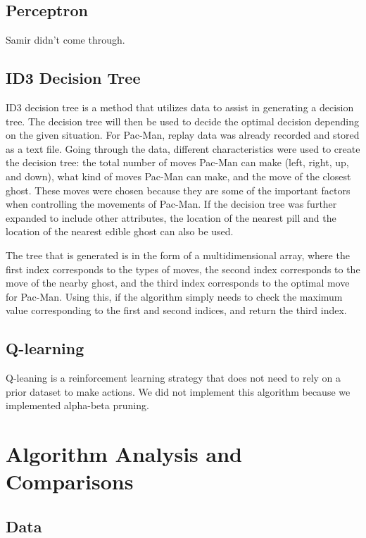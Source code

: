 \documentclass[a4paper,oneside,10pt]{report}
\begin{document}
\section{Perceptron}\label{perceptron}
Samir didn't come through.

\section{ID3 Decision Tree}\label{id3}
ID3 decision tree is a method that utilizes data to assist in generating a decision tree. The decision tree will then be used to decide the optimal decision depending on the given situation. For Pac-Man, replay data was already recorded and stored as a text file. Going through the data, different characteristics were used to create the decision tree: the total number of moves Pac-Man can make (left, right, up, and down), what kind of moves Pac-Man can make, and the move of the closest ghost. These moves were chosen because they are some of the important factors when controlling the movements of Pac-Man. If the decision tree was further expanded to include other attributes, the location of the nearest pill and the location of the nearest edible ghost can also be used. 

The tree that is generated is in the form of a multidimensional array, where the first index corresponds to the types of moves, the second index corresponds to the move of the nearby ghost, and the third index corresponds to the optimal move for Pac-Man. Using this, if the algorithm simply needs to check the maximum value corresponding to the first and second indices, and return the third index.

\section{Q-learning}\label{qlearn}
Q-leaning is a reinforcement learning strategy that does not need to rely on a prior dataset to make actions. We did not implement this algorithm because we implemented alpha-beta pruning.

\chapter{Algorithm Analysis and Comparisons} \label{comparison}

\section {Data} \label{compData}
\end{document}
